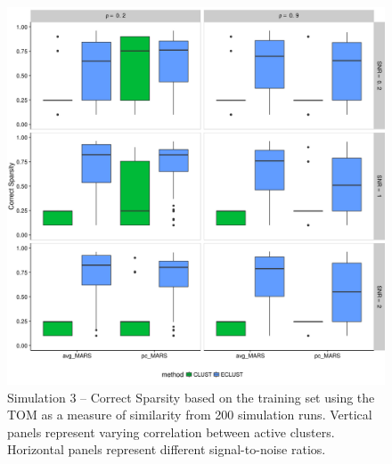 \begin{figure}[H]
	\centering
	\includegraphics[scale=0.6, keepaspectratio]{./figs/hydra/results/figures/sim3-sept27/CorrectSparsity_TOM_sim3.png}
	\caption{Simulation 3 -- Correct Sparsity based on the training set using the TOM as a measure of similarity from 200 simulation runs. Vertical panels represent varying correlation between active clusters. Horizontal panels represent different signal-to-noise ratios.}
	\label{fig:CorrectSparsity_TOM_sim3}
\end{figure}


